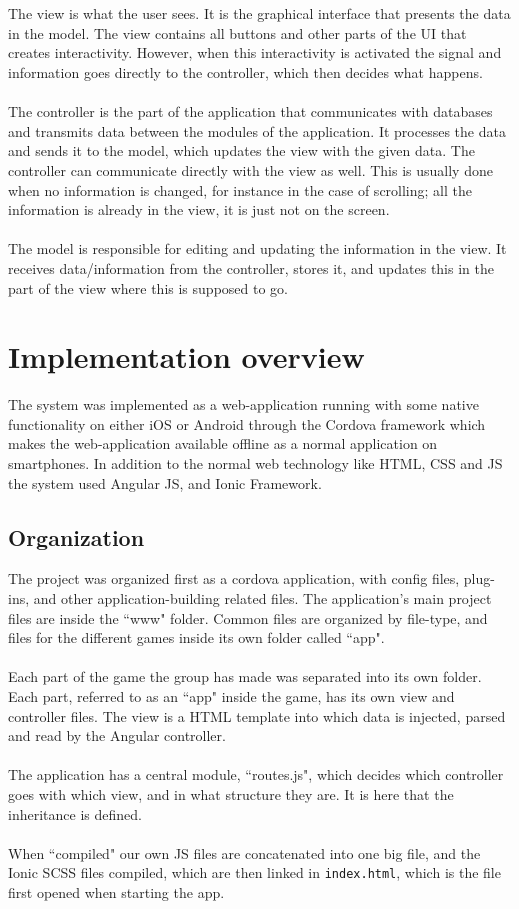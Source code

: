 \\
\\
The view is what the user sees. It is the graphical interface that presents the data in the model. The view contains all buttons and other parts of the UI that creates interactivity. However, when this interactivity is activated the signal and information goes directly to the controller, which then decides what happens.
\\
\\
The controller is the part of the application that communicates with databases and transmits data between the modules of the application. It processes the data and sends it to the model, which updates the view with the given data. The controller can communicate directly with the view as well. This is usually done when no information is changed, for instance in the case of scrolling; all the information is already in the view, it is just not on the screen.
\\
\\
The model is responsible for editing and updating the information in the view. It receives data/information from the controller, stores it, and updates this in the part of the view where this is supposed to go.


\section{Implementation overview}
The system was implemented as a web-application running with some native functionality on either iOS or Android through the Cordova framework \cite{cordova2} which makes the web-application available offline as a normal application on smartphones. In addition to the normal web technology like HTML, CSS and JS the system used Angular JS, and Ionic Framework.

\subsection{Organization}
The project was organized first as a cordova application, with config files, plug-ins, and other application-building related files. The application's main project files are inside the ``www" folder. Common files are organized by file-type, and files for the different games inside its own folder called ``app".\\
\\
Each part of the game the group has made was separated into its own folder. Each part, referred to as an ``app" inside the game, has its own view and controller files. The view is a HTML template into which data is injected, parsed and read by the Angular controller.\\
\\
The application has a central module, ``routes.js", which decides which controller goes with which view, and in what structure they are. It is here that the inheritance is defined.\\\\
When ``compiled" our own JS files are concatenated into one big file, and the Ionic SCSS files compiled, which are then linked in \texttt{index.html}, which is the file first opened when starting the app.

